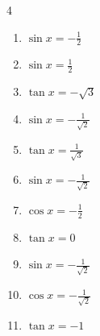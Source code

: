 \begin{multicols}{4}
\begin{enumerate}

  \item $\displaystyle \sin{x}  = -\frac{1}{2}$


  \item $\displaystyle \sin{x}  = \frac{1}{2}$


  \item $\displaystyle \tan{x}  = -\sqrt{3}$


  \item $\displaystyle \sin{x}  = -\frac{1}{\sqrt{2}}$


  \item $\displaystyle \tan{x}  = \frac{1}{\sqrt{3}}$


  \item $\displaystyle \sin{x}  = -\frac{1}{\sqrt{2}}$


  \item $\displaystyle \cos{x}  = -\frac{1}{2}$


  \item $\displaystyle \tan{x}  = 0$


  \item $\displaystyle \sin{x}  = -\frac{1}{\sqrt{2}}$


  \item $\displaystyle \cos{x}  = -\frac{1}{\sqrt{2}}$


\columnbreak %

  \item $\displaystyle \tan{x}  = -1$


\end{enumerate}
\end{multicols}
